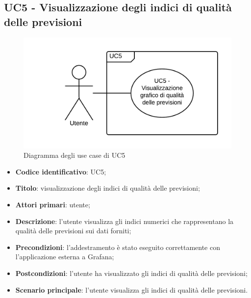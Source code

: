 \subsection{UC5 - Visualizzazione degli indici di qualità delle previsioni}
\begin{figure}[H]
\includegraphics{img/UC5_-_Visualizzazione_grafico_di_qualita_delle_previsioni.png}
\caption{Diagramma degli use case di UC5}
\end{figure}
\begin{itemize}
	\item \textbf{Codice identificativo}: UC5;
	\item \textbf{Titolo}: visualizzazione degli indici di qualità delle previsioni;
	\item \textbf{Attori primari}: utente;
	\item \textbf{Descrizione}: l'utente visualizza gli indici numerici che rappresentano la qualità delle previsioni sui dati forniti;
	\item \textbf{Precondizioni}: l'addestramento è stato eseguito correttamente con l'applicazione esterna a Grafana\glo;
	\item \textbf{Postcondizioni}: l'utente ha visualizzato gli indici di qualità delle previsioni;
	\item \textbf{Scenario principale}: l'utente visualizza gli indici di qualità delle previsioni.
\end{itemize} 
